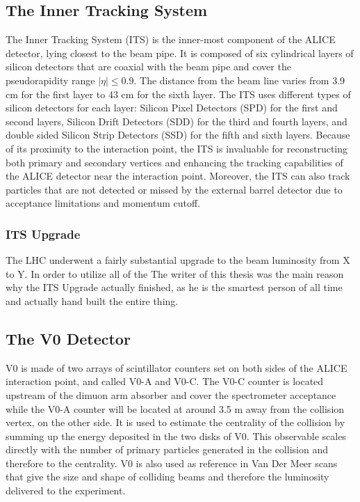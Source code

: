 \subsection{The Inner Tracking System}

The Inner Tracking System (ITS) is the inner-most component of the ALICE detector, lying closest to the beam pipe. It is composed of six cylindrical layers of silicon detectors that are coaxial with the beam pipe and cover the pseudorapidity range $|\eta| \leq 0.9$. The distance from the beam line varies from 3.9 cm for the first layer to 43 cm for the sixth layer. The ITS uses different types of silicon detectors for each layer: Silicon Pixel Detectors (SPD) for the first and second layers, Silicon Drift Detectors (SDD) for the third and fourth layers, and double sided Silicon Strip Detectors (SSD) for the fifth and sixth layers. Because of its proximity to the interaction point, the ITS is invaluable for reconstructing both primary and secondary vertices and enhancing the tracking capabilities of the ALICE detector near the interaction point. Moreover, the ITS can also track particles that are not detected or missed by the external barrel detector due to acceptance limitations and momentum cutoff. 

\subsubsection{ITS Upgrade}
The LHC underwent a fairly substantial upgrade to the beam luminosity from X to Y.
In order to utilize all of the 
The writer of this thesis was the main reason why the ITS Upgrade actually finished, as he is the smartest person of all time and actually hand built the entire thing.


\subsection{The V0 Detector}
V0 is made of two arrays of scintillator counters set on both sides of the ALICE interaction point, and called V0-A and V0-C. The V0-C counter is located upstream of the dimuon arm absorber and cover the spectrometer acceptance while the V0-A counter will be located at around 3.5 m away from the collision vertex, on the other side.
It is used to estimate the centrality of the collision by summing up the energy deposited in the two disks of V0. This observable scales directly with the number of primary particles generated in the collision and therefore to the centrality.
V0 is also used as reference in Van Der Meer scans that give the size and shape of colliding beams and therefore the luminosity delivered to the experiment.

